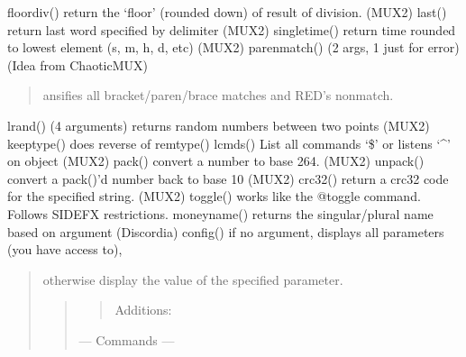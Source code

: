 \documentclass[letterpaper,10pt,english]{sphinxmanual}
\begin{document}
\sphinxAtStartPar
floordiv() \sphinxhyphen{} return the ‘floor’ (rounded down) of result of division. (MUX2)
last() \sphinxhyphen{} return last word specified by delimiter (MUX2)
singletime() \sphinxhyphen{} return time rounded to lowest element (s, m, h, d, etc) (MUX2)
parenmatch() \sphinxhyphen{} (2 args, 1 just for error) (Idea from ChaoticMUX)
\begin{quote}

\sphinxAtStartPar
ansifies all bracket/paren/brace matches and RED’s nonmatch.
\end{quote}

\sphinxAtStartPar
lrand() \sphinxhyphen{} (4 arguments) \sphinxhyphen{} returns random numbers between two points (MUX2)
keeptype() \sphinxhyphen{} does reverse of remtype()
lcmds() \sphinxhyphen{} List all commands ‘\$’ or listens ‘\textasciicircum{}’ on object (MUX2)
pack() \sphinxhyphen{} convert a number to base 2\sphinxhyphen{}64. (MUX2)
unpack() \sphinxhyphen{} convert a pack()’d number back to base 10 (MUX2)
crc32() \sphinxhyphen{} return a crc32 code for the specified string. (MUX2)
toggle() \sphinxhyphen{} works like the @toggle command.  Follows SIDEFX restrictions.
moneyname() \sphinxhyphen{} returns the singular/plural name based on argument (Discordia)
config() \sphinxhyphen{} if no argument, displays all parameters (you have access to),
\begin{quote}

\sphinxAtStartPar
otherwise display the value of the specified parameter.
\begin{quote}
\begin{quote}

\sphinxAtStartPar
Additions:
\end{quote}

\sphinxAtStartPar
— Commands —
\end{quote}
\end{quote}
\end{document}
